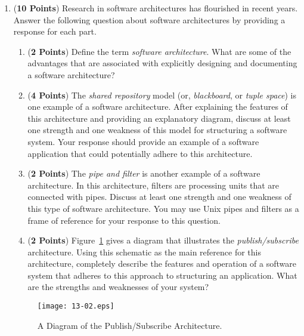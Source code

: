 \documentclass[12pt,epsf,psfig,graphics]{article}
\begin{document}
\begin{enumerate}
\newpage

\item ({\bf 10 Points}) Research in software architectures has flourished
in recent years.  Answer the following question about software architectures
by providing a response for each part.

\begin{enumerate}


\item ({\bf 2 Points}) Define the term {\em software architecture}.  What are some of the advantages that are associated
  with explicitly designing and documenting a software architecture? 

\item ({\bf 4 Points}) The {\em shared repository} model (or, {\em
  blackboard}, or {\em tuple space}) is one example of a software
  architecture.  After explaining the features of this architecture
  and providing an explanatory diagram, discuss at least one strength
  and one weakness of this model for structuring a software system.
  Your response should provide an example of a software application
  that could potentially adhere to this architecture.

\item ({\bf 2 Points}) The {\em pipe and filter} is another example of a software architecture.  In this architecture,
  filters are processing units that are connected with pipes.  Discuss at least one strength and one weakness of this
  type of software architecture.  You may use Unix pipes and filters as a frame of reference for your response to this
  question.

\item ({\bf 2 Points}) Figure~\ref{fig:ps} gives a diagram that
  illustrates the {\em publish/subscribe} architecture.  Using this
  schematic as the main reference for this architecture, completely
  describe the features and operation of a software system that
  adheres to this approach to structuring an application.  What are
  the strengths and weaknesses of your system?

\end{enumerate}

\begin{figure}[h]
\begin{center}
\texttt{[image: 13-02.eps]}
\end{center}
\vspace*{-.2in}
\caption{A Diagram of the Publish/Subscribe Architecture.}
\vspace*{-.15in}
\label{fig:ps}
\end{figure}


\end{enumerate}
\end{document}
